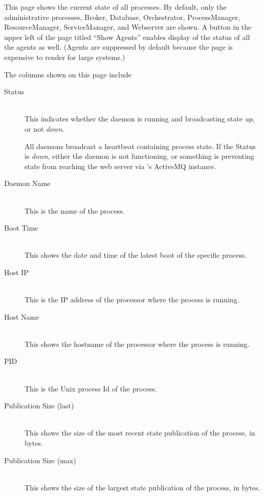 This page shows the current state of all {\DUCC} processes.  By default, only the administrative
processes, Broker, Database, Orchestrator, ProcessManager, ResourceManager, ServiceManager, and Webserver are
shown.  A button in the upper left of the page titled ``Show Agents'' enables display of
the status of all the {\DUCC} agents as well. (Agents are suppressed by default because the
page is expensive to render for large systems.)

The columns shown on this page include

   \begin{description}
      \item[Status] \hfill \\
        This indicates whether the daemon is running and broadcasting state {\em up},
        or not {\em down}.  
        
        All {\DUCC} daemons broadcast a heartbeat containing process state.  If the Status
        is {\em down}, either the daemon is not functioning, or something is preventing
        state from reaching the web server via {\DUCC}'s ActiveMQ instance.

      \item[Daemon Name] \hfill \\
        This is the name of the process.

      \item[Boot Time] \hfill \\ 
        This shows the date and time of the latest boot of the specific process.
          
      \item[Host IP] \hfill \\ 
        This is the IP address of the processor where the process is running.

      \item[Host Name] \hfill \\ 
        This shows the hostname of the processor where the process is running.

      \item[PID] \hfill \\ 
        This is the Unix process Id of the {\DUCC} process.

      \item[Publication Size (last)] \hfill \\ 
        This shows the size of the most recent state publication of the process, in bytes.

      \item[Publication Size (max)] \hfill \\ 
        This shows the size of the largest state publication of the process, in bytes.


\end{description}
